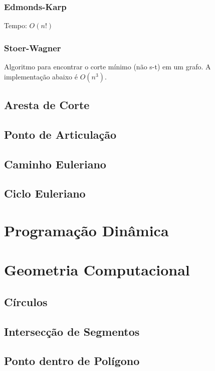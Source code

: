 \documentclass[12pt,a4paper]{article}
\begin{document}
			\subsubsection{Edmonds-Karp}
				Tempo: \( O(n!) \) %
				
			\subsubsection{Stoer-Wagner}
				Algoritmo para encontrar o corte mínimo (não s-t) em um grafo. A implementação abaixo é \(O(n^3)\).
				
		\subsection{Aresta de Corte}
			
		\subsection{Ponto de Articulação}
			
		\subsection{Caminho Euleriano}
		\subsection{Ciclo Euleriano}

	\section{Programação Dinâmica}
	
	\section{Geometria Computacional}
		
		\subsection{Círculos}
			
		\subsection{Intersecção de Segmentos}
			
		\subsection{Ponto dentro de Polígono}
\end{document}
